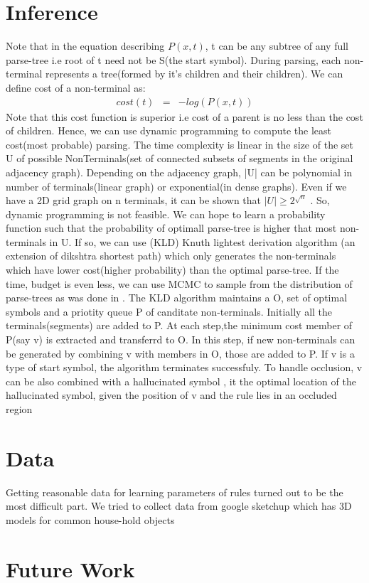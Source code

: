 \documentclass[11pt]{article} %
\begin{document}
\section{Inference}
Note that in the equation describing $P(x,t)$, t can be any subtree of any full parse-tree i.e root of t need not be S(the start symbol). During parsing, each non-terminal represents a tree(formed by it's children and their children). We can define cost of a non-terminal as:
\begin{eqnarray}
cost(t)&=&-log(P(x,t))
\end{eqnarray}
 Note that this cost function is superior i.e cost of a parent is no less than the cost of children. Hence, we can use dynamic programming to compute the least cost(most probable) parsing. The time complexity is linear in the size of the set U of possible NonTerminals(set of connected subsets of segments in the original adjacency graph). Depending on the adjacency graph, |U| can be polynomial in number of terminals(linear graph) or exponential(in dense graphs). Even if we have a 2D grid graph on n terminals, it can be shown that $|U|\ge 2^{\sqrt{n}}$ . So, dynamic programming is not feasible. We can hope to learn a probability function such that the probability of optimall parse-tree is higher that most non-terminals in U. If so, we can use (KLD) Knuth lightest derivation algorithm (an extension of dikshtra shortest path) which only generates the non-terminals which have lower cost(higher probability) than the optimal parse-tree. If the time, budget is even less, we can use MCMC to sample from the distribution of parse-trees as was done in \cite{zhu2011}. The KLD algorithm maintains a O, set of optimal symbols and a priotity queue P of canditate non-terminals.  Initially all the terminals(segments) are added to P.  At each step,the minimum cost member of P(say v) is extracted and transferrd to O. In this step, if new non-terminals can be generated by combining v with members in O, those are added to P. If v is a type of start symbol, the algorithm terminates successfuly. To handle occlusion, v can be also combined with a hallucinated symbol , it the optimal location of the hallucinated symbol, given the position of v and the rule lies in an occluded region


\section{Data}
Getting reasonable data for learning parameters of rules turned out to be the most difficult part. We tried to collect data from google sketchup which has 3D models for common house-hold objects

\section{Future Work}

{  


}
\end{document}
